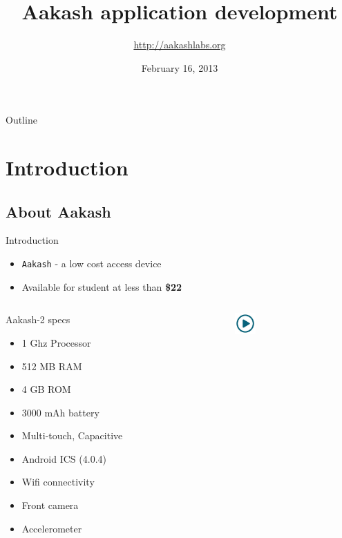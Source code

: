 \documentclass{beamer}
\title[Aakash application development]{Aakash application development}
\author{\url{http://aakashlabs.org}}
\institute{Indian Institute of Technology, Bombay}
\date{February 16, 2013}
\begin{document}
 \begin{frame}
   \titlepage
 \end{frame}
 \begin{frame}{Outline}
  \tableofcontents
 \end{frame}
 \section{Introduction}
 \subsection{About Aakash}
 \begin{frame}{Introduction}
 \begin{itemize}
   \item {\tt Aakash} - a low cost access device
   \item Available for student at less than {\bf \$22}
 \end{itemize}
 \begin{columns}
 \begin{column}{.48\textwidth}
 \begin{block}{Aakash-2 specs}
 \begin{itemize}
   \item 1 Ghz Processor
   \item 512 MB RAM
   \item 4 GB ROM
   \item 3000 mAh battery
   \item Multi-touch, Capacitive
   \item Android ICS (4.0.4) 
   \item Wifi connectivity
   \item Front camera
   \item Accelerometer
 \end{itemize}
 \end{block}
 \end{column}%
 \begin{column}{.20\textwidth}
   \centerline{\href{file:///home/sachin/github/slides/scipy2012/android_app.3gp}{\includegraphics[height=0.8cm,width=0.8cm]{play.jpg}}}
 \end{column}%
 \end{columns}
 \end{frame}
\end{document}
